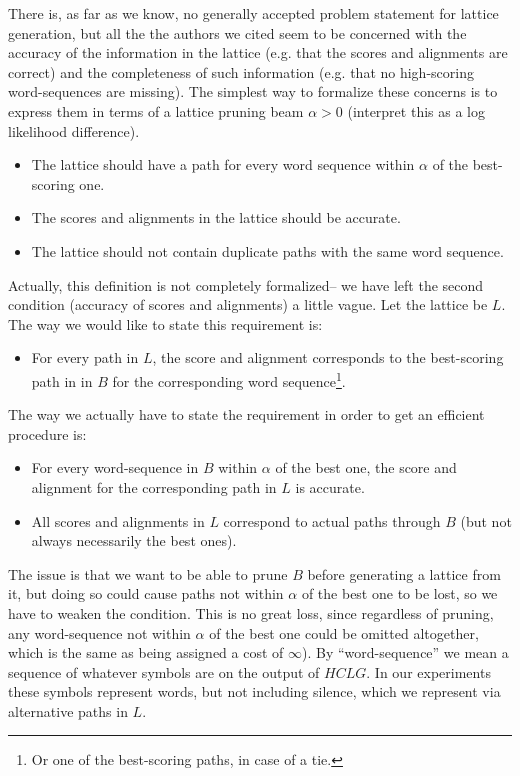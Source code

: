 \documentclass{article}
\def\HCLG{{\mathit{HCLG}}}
\begin{document}
There is, as far as we know, no generally accepted problem statement
for lattice generation, but all the the authors we cited seem to
be concerned with the accuracy of the information in the lattice (e.g. that the
scores and alignments are correct) and the completeness of such information (e.g.
that no high-scoring word-sequences are missing).  The simplest
way to formalize these concerns is to express them in terms of a lattice 
pruning beam $\alpha > 0$ (interpret this as a log likelihood difference).
\begin{itemize}
  \item The lattice should have a path for every word sequence within $\alpha$ of the best-scoring one.
  \item The scores and alignments in the lattice should be accurate.
  \item The lattice should not contain duplicate paths with the same word sequence.
\end{itemize}
Actually, this definition is not completely formalized-- we have left
the second condition (accuracy of scores and alignments) a little vague.
Let the lattice be $L$.  The way we would like to state this requirement is:
\begin{itemize}
  \item For every path in $L$, the score and alignment corresponds to 
   the best-scoring path in in $B$ for the corresponding word
   sequence\footnote{Or one of the best-scoring paths, in case of a tie.}.
\end{itemize}
The way we actually have to state the requirement in order to get an efficient procedure is:
\begin{itemize}
  \item For every word-sequence in $B$ within $\alpha$ of the best one, the score and alignment
    for the corresponding path in $L$ is accurate.
  \item All scores and alignments in $L$ correspond to actual paths through $B$ (but not always
   necessarily the best ones).
\end{itemize}
The issue is that we want to be able to prune $B$ before generating a lattice from it,
but doing so could cause paths not within $\alpha$ of the best one to be lost, so we have
to weaken the condition.  This is no great loss, since regardless
of pruning, any word-sequence not within $\alpha$ of the best one could be omitted altogether, 
which is the same as being assigned a cost of $\infty$).
By ``word-sequence'' we mean a sequence of whatever symbols are on the
output of $\HCLG$.  In our experiments these symbols represent words, but not including
silence, which we represent via alternative paths in $L$.
\end{document}
